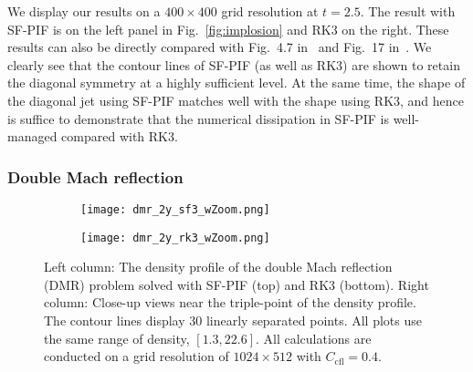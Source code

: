 \documentclass[times,preprint,3p]{elsarticle}
\begin{document}
We display our results on a \( 400 \times 400 \) grid resolution at $t=2.5$.
The result with SF-PIF is on the left panel in Fig.~\ref{fig:implosion} and
RK3 on the right.
%
These results can also be directly compared with
Fig.~4.7 in~\cite{liska2003comparison} and Fig.~17 in~\cite{stone2008athena}.
We clearly see that the contour lines
of SF-PIF (as well as RK3)
are shown to retain the diagonal symmetry at a highly sufficient level.
At the same time, the shape of the diagonal jet using SF-PIF matches
well with the shape using RK3,
and hence is suffice to demonstrate that the numerical dissipation in SF-PIF
is well-managed compared with RK3.




\subsubsection{Double Mach reflection}\label{sec:dmr}

\begin{figure}[hb!]
    \centering
    \begin{subfigure}{160mm}
        \centering
        \texttt{[image: dmr\_2y\_sf3\_wZoom.png]}
    \end{subfigure}\vspace{3mm}
    \begin{subfigure}{160mm}
        \centering
        \texttt{[image: dmr\_2y\_rk3\_wZoom.png]}
    \end{subfigure}
    \caption{Left column: The density profile of the double Mach reflection (DMR)
        problem solved with SF-PIF (top) and RK3 (bottom).
        Right column: Close-up views near the triple-point of the density profile.
        The contour lines display 30 linearly separated points.
        All plots use the same range of density, \( [1.3, 22.6] \).
        All calculations are conducted on a grid resolution of
        \( 1024 \times 512 \) with $C_{\text{cfl}}= 0.4$.}\label{fig:dmr}
\end{figure}
\end{document}
